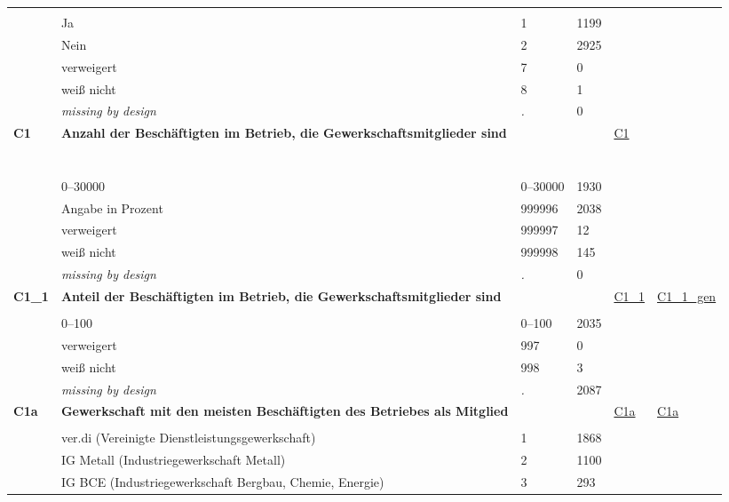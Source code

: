 \begin{longtable}{| L{2.45cm} | L{6cm} | C{1.5cm} | R{1cm} | C{2.25cm} | C{2.25cm} |}
   &  &  &  &  &  \\ 
   & Ja & 1 & 1199 &  &  \\ 
   & Nein & 2 & 2925 &  &  \\ 
   & verweigert & 7 & 0 &  &  \\ 
   & weiß nicht & 8 & 1 &  &  \\ 
   & \textit{missing by design} & \textit{.} & 0 &  &  \\ 
   \midrule
\textbf{C1}\label{var:C1} & \textbf{Anzahl der Beschäftigten im Betrieb, die Gewerkschaftsmitglieder sind} &  &  & \hyperref[C1]{C1} & \hyperref[var:suf:]{} \\ 
   & \protect\subsection[Variablen C1 bis Order03\_D1c]{} &  &  &  &  \\ 
   & 0--30000 & 0--30000 & 1930 &  &  \\ 
   & Angabe in Prozent & 999996 & 2038 &  &  \\ 
   & verweigert & 999997 & 12 &  &  \\ 
   & weiß nicht & 999998 & 145 &  &  \\ 
   & \textit{missing by design} & \textit{.} & 0 &  &  \\ 
   \midrule
\textbf{C1\_1}\label{var:C1:1} & \textbf{Anteil der Beschäftigten im Betrieb, die Gewerkschaftsmitglieder sind} &  &  & \hyperref[C1:1]{C1\_1} & \hyperref[var:suf:C1:1:gen]{C1\_1\_gen} \\ 
   &  &  &  &  &  \\ 
   & 0--100 & 0--100 & 2035 &  &  \\ 
   & verweigert & 997 & 0 &  &  \\ 
   & weiß nicht & 998 & 3 &  &  \\ 
   & \textit{missing by design} & \textit{.} & 2087 &  &  \\ 
   \midrule
\textbf{C1a}\label{var:C1a} & \textbf{Gewerkschaft mit den meisten Beschäftigten des Betriebes als Mitglied} &  &  & \hyperref[C1a]{C1a} & \hyperref[var:suf:C1a]{C1a} \\ 
   &  &  &  &  &  \\ 
   & ver.di (Vereinigte Dienstleistungsgewerkschaft) & 1 & 1868 &  &  \\ 
   & IG Metall (Industriegewerkschaft Metall) & 2 & 1100 &  &  \\ 
   & IG BCE (Industriegewerkschaft Bergbau, Chemie, Energie) & 3 & 293 &  &  \\ 

\end{longtable}
